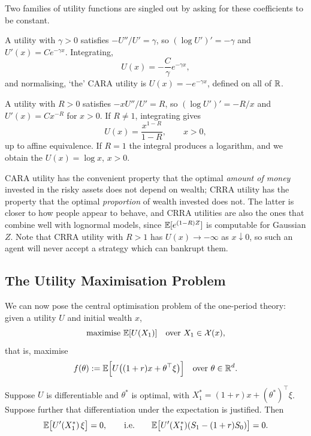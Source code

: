 \documentclass[a4paper]{scrartcl}
\begin{document}
Two families of utility functions are singled out by asking for these coefficients to be constant.

\begin{example}
	A utility with  $\gamma > 0$ satisfies $-U''/U' = \gamma$, so $(\log U')' = -\gamma$ and $U'(x) = Ce^{-\gamma x}$. Integrating,
	$$
	U(x) = -\frac{C}{\gamma}e^{-\gamma x},
	$$
	and normalising, `the' CARA utility is $U(x) = -e^{-\gamma x}$, defined on all of $\mathbb{R}$.
\end{example}

\begin{example}
	A utility with  $R > 0$ satisfies $-xU''/U' = R$, so $(\log U')' = -R/x$ and $U'(x) = Cx^{-R}$ for $x > 0$. If $R \neq 1$, integrating gives
	$$
	U(x) = \frac{x^{1-R}}{1-R}, \qquad x > 0,
	$$
	up to affine equivalence. If $R = 1$ the integral produces a logarithm, and we obtain the  $U(x) = \log x$, $x > 0$.
\end{example}

\begin{remark}
	CARA utility has the convenient property that the optimal \emph{amount of money} invested in the risky assets does not depend on wealth; CRRA utility has the property that the optimal \emph{proportion} of wealth invested does not. The latter is closer to how people appear to behave, and CRRA utilities are also the ones that combine well with lognormal models, since $\mathbb{E}[e^{(1-R)Z}]$ is computable for Gaussian $Z$. Note that CRRA utility with $R > 1$ has $U(x) \to -\infty$ as $x \downarrow 0$, so such an agent will never accept a strategy which can bankrupt them.
\end{remark}

\subsection{The Utility Maximisation Problem}

We can now pose the central optimisation problem of the one-period theory: given a utility $U$ and initial wealth $x$,
$$
\text{maximise } \mathbb{E}[U(X_1)] \quad \text{over } X_1 \in \mathcal{X}(x),
$$
that is, maximise
$$
f(\theta) := \mathbb{E}\Big[U\big((1+r)x + \theta^\top \xi\big)\Big] \quad \text{over } \theta \in \mathbb{R}^d.
$$

\begin{theorem}\label{thm:foc}
	Suppose $U$ is differentiable and $\theta^*$ is optimal, with $X_1^* = (1+r)x + (\theta^*)^\top\xi$. Suppose further that differentiation under the expectation is justified. Then
	$$
	\mathbb{E}\big[U'(X_1^*)\,\xi\big] = 0, \qquad \text{i.e.} \qquad \mathbb{E}\big[U'(X_1^*)(S_1 - (1+r)S_0)\big] = 0.
	$$
\end{theorem}
\end{document}
